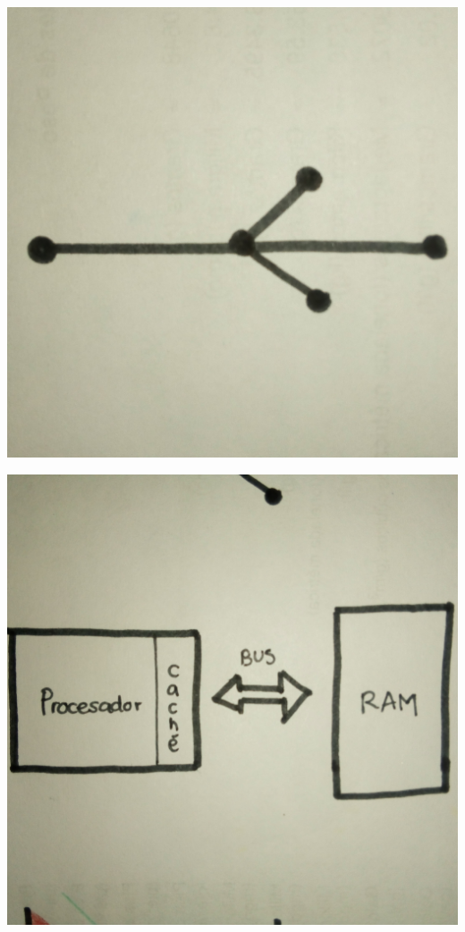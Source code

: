 \begin{center}
\includegraphics[scale=.05]{imagenes/9.jpg}
\end{center}
\begin{center}
\includegraphics[scale=.05]{imagenes/10.jpg}
\end{center}
